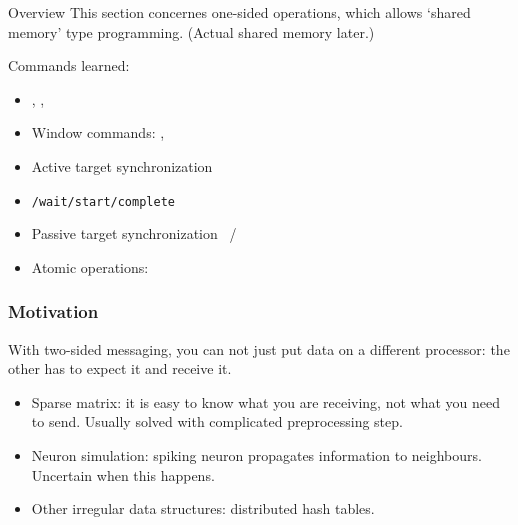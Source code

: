 
\begin{frame}[containsverbatim]{Overview}
  This section concernes one-sided operations, which allows `shared
  memory' type programming. (Actual shared memory later.)

  Commands learned:
  \begin{itemize}
  \item {}, , 
  \item Window commands: , 
  \item Active target synchronization 
  \item {}\lstinline{/wait/start/complete}
  \item Passive target synchronization ~/
  \item Atomic operations: 
  \end{itemize}
\end{frame}


\begin{frame}[containsverbatim]\frametitle{Motivation}
  With two-sided messaging, you can not just put data
  on a different processor: the other has to expect it and receive it.

  \begin{itemize}
  \item Sparse matrix: it is easy to know what you are receiving, not what you need to send.
    Usually solved with complicated preprocessing step.
  \item Neuron simulation: spiking neuron propagates information to neighbours.
    Uncertain when this happens.
  \item Other irregular data structures: distributed hash tables.
  \end{itemize}
\end{frame}

